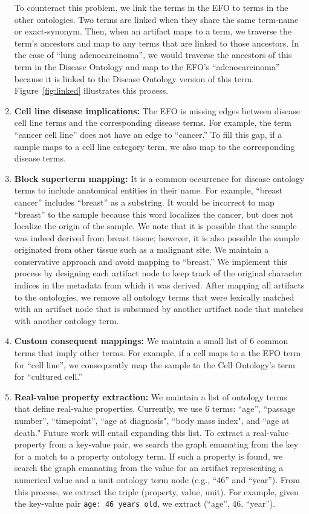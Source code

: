 \begin{enumerate}
To counteract this problem, we link the terms in the EFO to terms in the other ontologies.  Two terms are linked when they share the same term-name or exact-synonym.  Then, when an artifact maps to a term, we traverse the term's ancestors and map to any terms that are linked to those ancestors.   In the case of ``lung adenocarcinoma'', we would traverse the ancestors of this term in the Disease Ontology and map to the EFO's ``adenocarcinoma'' because it is linked to the Disease Ontology version of this term. Figure~\ref{fig:linked} illustrates this process. 


\item \textbf{Cell line disease implications:} The EFO is missing edges between disease cell line terms and the corresponding disease terms. For example, the term ``cancer cell line'' does not have an edge to ``cancer.''  To fill this gap, if a sample maps to a cell line category term, we also map to the corresponding disease terms. 


\item \textbf{Block superterm mapping:} It is a common occurrence for disease ontology terms to include anatomical entities in their name. For example, ``breast cancer'' includes ``breast'' as a substring. It would be incorrect to map ``breast'' to the sample because this word localizes the cancer, but does not localize the origin of the sample.  We note that it is possible that the sample was indeed derived from breast tissue; however, it is also possible the sample originated from other tissue such as a malignant site.  We maintain a conservative approach and avoid mapping to ``breast.''  We implement this process by designing each artifact node to keep track of the original character indices in the metadata from which it was derived. After mapping all artifacts to the ontologies, we remove all ontology terms that were lexically matched with an artifact node that is subsumed by another artifact node that matches with another ontology term.  

\item \textbf{Custom consequent mappings:}  We maintain a small list of 6 common terms that imply other terms.  For example, if a cell maps to a the EFO term for ``cell line'', we consequently map the sample to the Cell Ontology's term for ``cultured cell.''  

\item \textbf{Real-value property extraction:} We maintain a list of ontology terms that define real-value properties. Currently, we use 6 terms: ``age'', ``passage number'', ``timepoint'', ``age at diagnosis", ``body mass index", and ``age at death."  Future work will entail expanding this list.  To extract a real-value property from a key-value pair, we search the graph emanating from the key for a match to a property ontology term.  If such a property is found, we search the graph emanating from the value for an artifact representing a numerical value and a unit ontology term node (e.g., ``46'' and ``year'').  From this process, we extract the triple (property, value, unit). For example, given the key-value pair \texttt{age: 46 years old}, we extract (``age'', 46, ``year'').



\end{enumerate}
